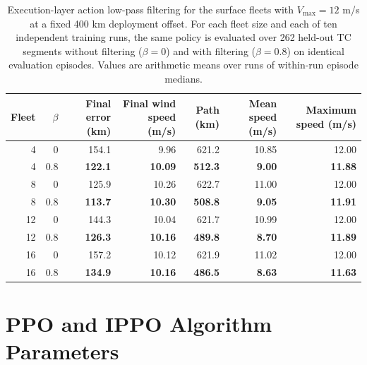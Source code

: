 \documentclass[a4paper,fleqn]{cas-dc}
\begin{document}
\begin{table}[p]
\centering
\caption{Execution-layer action low-pass filtering for the surface fleets with \(V_{\max}=12\) m/s at a fixed 400 km deployment offset. For each fleet size and each of ten independent training runs, the same policy is evaluated over 262 held-out TC segments without filtering (\(\beta=0\)) and with filtering (\(\beta=0.8\)) on identical evaluation episodes. Values are arithmetic means over runs of within-run episode medians.}
\label{tab:surface_control_ablations}
\small
\begin{tabular*}{\textwidth}{@{\extracolsep{\fill}}rrrrrrr@{}}
\toprule
Fleet & $\beta$ & Final error (km) & Final wind speed (m/s) & Path (km) & Mean speed (m/s) & Maximum speed (m/s) \\
\midrule
4 & 0 & 154.1 & 9.96 & 621.2 & 10.85 & 12.00 \\
4 & 0.8 & \textbf{122.1} & \textbf{10.09} & \textbf{512.3} & \textbf{9.00} & \textbf{11.88} \\
8 & 0 & 125.9 & 10.26 & 622.7 & 11.00 & 12.00 \\
8 & 0.8 & \textbf{113.7} & \textbf{10.30} & \textbf{508.8} & \textbf{9.05} & \textbf{11.91} \\
12 & 0 & 144.3 & 10.04 & 621.7 & 10.99 & 12.00 \\
12 & 0.8 & \textbf{126.3} & \textbf{10.16} & \textbf{489.8} & \textbf{8.70} & \textbf{11.89} \\
16 & 0 & 157.2 & 10.12 & 621.9 & 11.02 & 12.00 \\
16 & 0.8 & \textbf{134.9} & \textbf{10.16} & \textbf{486.5} & \textbf{8.63} & \textbf{11.63} \\
\bottomrule
\end{tabular*}
\end{table}

\clearpage
\makeatletter
\setlength{\@fptop}{0pt plus 1fil}
\setlength{\@fpbot}{0pt plus 1fil}
\makeatother
\section{PPO and IPPO Algorithm Parameters}\label{app:parameters}

\setcounter{table}{0}
\renewcommand{\thetable}{C.\arabic{table}}
\renewcommand{\theHtable}{C.\arabic{table}}
\end{document}
